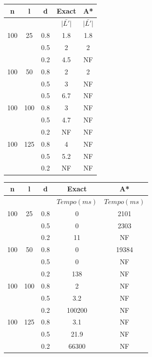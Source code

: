 \documentclass[12pt]{article}
\begin{document}
		\vspace{2cm}

		\begin{tabular}{c|c|c|c|c} \hline
			n & l & d & Exact & A* \\ \hline
			& & & $\bar{|L'|}$ & $\bar{|L'|}$ \\ \hline
			100 & 25  & 0.8 & 1.8 & 1.8\\
			   &      & 0.5 &  2 & 2\\
			   &      & 0.2 & 4.5 & NF\\ \hline
			100 & 50  & 0.8 &  2 & 2 \\
			   &      & 0.5 &  3 & NF\\
			   &      & 0.5 & 6.7 & NF\\ \hline
			100 & 100 & 0.8 &  3 & NF\\
			   &      & 0.5 & 4.7 & NF\\
			   &      & 0.2 & NF & NF\\ \hline
			100 & 125 & 0.8 & 4 & NF\\
			   &      & 0.5 & 5.2 & NF\\
			   &      & 0.2 & NF & NF\\ \hline
		\end{tabular}


		\vspace{2cm}

		\begin{tabular}{c|c|c|c|c} \hline
			n & l & d & Exact & A* \\ \hline
			& & & $Tempo(ms)$ & $Tempo(ms)$\\ \hline
			100 & 25  & 0.8 &  0 & 2101\\
			   &      & 0.5 &  0 & 2303\\
			   &      & 0.2 & 11 & NF\\ \hline
			100 & 50  & 0.8 &  0 & 19384 \\
			   &      & 0.5 &  0 & NF\\
			   &      & 0.2 & 138 & NF\\ \hline
			100 & 100 & 0.8 &  2 & NF\\
			   &      & 0.5 & 3.2 & NF\\
			   &      & 0.2 & 100200 & NF\\ \hline
			100 & 125 & 0.8 & 3.1 & NF\\
			   &      & 0.5 & 21.9 & NF\\
			   &      & 0.2 & 66300 & NF\\ \hline
		\end{tabular}
\end{document}
